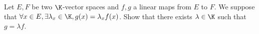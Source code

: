 Let $E, F$ be two $\K$-vector spaces and $f,g$ a linear maps from $E$ to $F$. We suppose that $\forall x \in E, \exists \lambda_x \in \K, g(x) = \lambda_x f(x)$. Show that there exists $\lambda \in \K$ such that $g = \lambda f$.